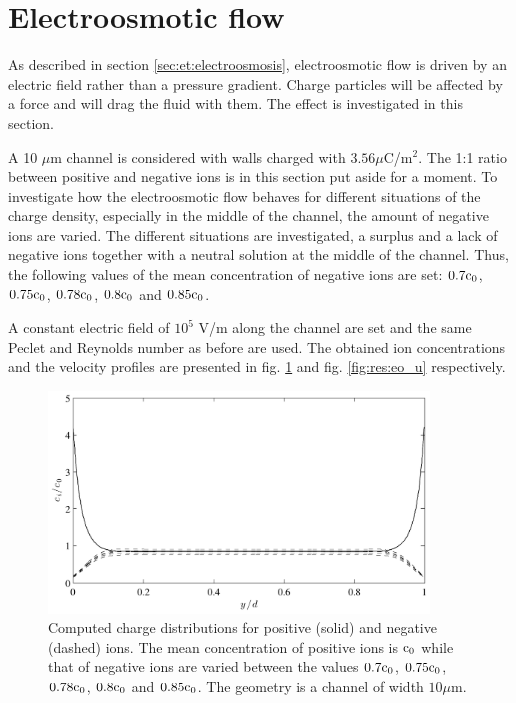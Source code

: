 \section{Electroosmotic flow}
As described in section \ref{sec:et:electroosmosis}, electroosmotic
flow is driven by an electric field rather than a pressure gradient.
Charge particles will be affected by a force and will drag the fluid
with them. The effect is investigated in this section.

A 10 $\mu$m channel is considered with walls charged with $3.56
\mu$C/m$^2$. The 1:1 ratio between positive and negative ions is in
this section put aside for a moment. To investigate how the
electroosmotic flow behaves for different situations of the charge
density, especially in the middle of the channel, the amount of
negative ions are varied. The different situations are investigated, a
surplus and a lack of negative ions together with a neutral solution
at the middle of the channel. Thus, the following values of the mean
concentration of negative ions are set: $0.7\mathrm{c}_0$, $0.75\mathrm{c}_0$,
$0.78\mathrm{c}_0$, $0.8\mathrm{c}_0$ and $0.85\mathrm{c}_0$. 

A constant electric field of $10^5$ V/m along the channel are set
and the same Peclet and Reynolds number as before are used. The
obtained ion concentrations and the velocity profiles are presented in
fig. \ref{fig:res:eo_charge} and fig. \ref{fig:res:eo_u}
respectively. 

\begin{figure}
\begin{center}
\includegraphics[width=0.9\textwidth]{fig/eo_conc.pdf}
\end{center}
\caption[Charge distributions for a varied ratio of positive and
  negative ions.]{Computed charge distributions for positive (solid)
  and negative (dashed) ions. The mean concentration of positive ions
  is $\mathrm{c}_0$ while that of negative ions are varied between the values
  $0.7\mathrm{c}_0$, $0.75\mathrm{c}_0$, $0.78\mathrm{c}_0$, $0.8\mathrm{c}_0$ and $0.85\mathrm{c}_0$. The
  geometry is a channel of width $10 \mu$m.}
\label{fig:res:eo_charge}
\end{figure}

